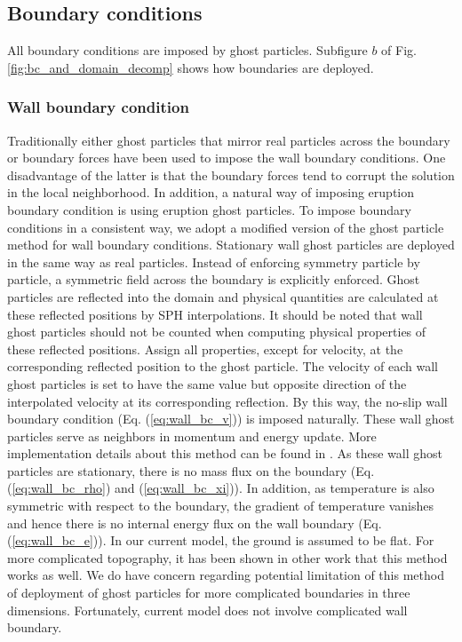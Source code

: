 \documentclass[gmd, manuscript]{copernicus}
\begin{document}
\subsection{Boundary conditions}
All boundary conditions are imposed by ghost particles. Subfigure $b$ of Fig. \ref{fig:bc_and_domain_decomp} shows how boundaries are deployed. 
\subsubsection{Wall boundary condition}
Traditionally either ghost particles that mirror real particles across the boundary \citep {ferrari2009new} or boundary forces \citep {monaghan2009sph} have been used to impose the wall boundary conditions. One disadvantage of the latter  is that the boundary forces tend to corrupt the solution in the local neighborhood. In addition, a natural way of imposing eruption boundary condition is using eruption ghost particles. To impose boundary conditions in a consistent way, we adopt a modified version of the ghost particle method \citep {kumar2013parallel} for wall boundary conditions. Stationary wall ghost particles are deployed in the same way as real particles. Instead of enforcing symmetry particle by particle, a symmetric field across the boundary is explicitly enforced. Ghost particles are reflected into the domain and physical quantities are calculated at these reflected positions by SPH interpolations. It should be noted that wall ghost particles should not be counted when computing physical properties of these reflected positions. Assign all properties, except for velocity, at the corresponding reflected position to the ghost particle. The velocity of each wall ghost particles is set to have the same value but opposite direction of the interpolated velocity at its corresponding reflection. By this way, the no-slip wall boundary condition (Eq. (\ref{eq:wall_bc_v})) is imposed naturally. These wall ghost particles serve as neighbors in momentum and energy update. More implementation details about this method can be found in \citep {kumar2013parallel}. As these wall ghost particles are stationary, there is no mass flux on the boundary (Eq. (\ref{eq:wall_bc_rho}) and (\ref{eq:wall_bc_xi})). In addition, as temperature is also symmetric with respect to the boundary, the gradient of temperature vanishes and hence there is no internal energy flux on the wall boundary (Eq. (\ref{eq:wall_bc_e})). 
In our current model, the ground is assumed to be  flat. For more complicated topography, it has been shown in other work \citep {kumar2013parallel} that this method works as well. We do have concern regarding potential limitation of this method of deployment of ghost particles for more complicated boundaries in three dimensions. Fortunately, current model does not involve complicated wall boundary.
\end{document}

